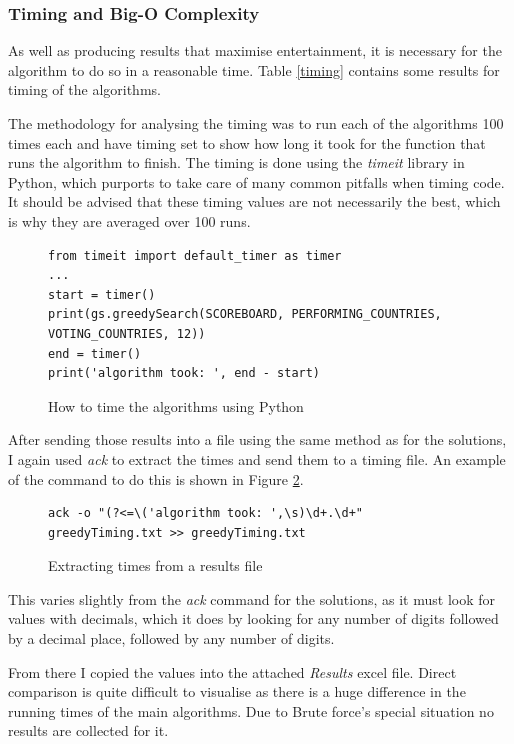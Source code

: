 \documentclass[12pt]{report}
\begin{document}
\subsubsection{Timing and Big-O Complexity}
As well as producing results that maximise entertainment, it is necessary for the algorithm to do so in a reasonable time. Table \ref{timing} contains some results for timing of the algorithms.

The methodology for analysing the timing was to run each of the algorithms 100 times each and have timing set to show how long it took for the function that runs the algorithm to finish. The timing is done using the \textit{timeit}\cite{PythonTimeit} library in Python, which purports to take care of many common pitfalls when timing code. It should be advised that these timing values are not necessarily the best, which is why they are averaged over 100 runs.

\begin{figure}[H]
\caption{How to time the algorithms using Python}
\label{timingCode}
\begin{verbatim}
from timeit import default_timer as timer
...
start = timer()
print(gs.greedySearch(SCOREBOARD, PERFORMING_COUNTRIES, VOTING_COUNTRIES, 12))
end = timer()
print('algorithm took: ', end - start)
\end{verbatim}
\end{figure}

After sending those results into a file using the same method as for the solutions, I again used \textit{ack} to extract the times and send them to a timing file. An example of the command to do this is shown in Figure \ref{timingAck}.

\begin{figure}[H]
\caption{Extracting times from a results file}
\label{timingAck}
\begin{verbatim}
ack -o "(?<=\('algorithm took: ',\s)\d+.\d+" greedyTiming.txt >> greedyTiming.txt
\end{verbatim}
\end{figure}

This varies slightly from the \textit{ack} command for the solutions, as it must look for values with decimals, which it does by looking for any number of digits followed by a decimal place, followed by any number of digits.

From there I copied the values into the attached \textit{Results} excel file. Direct comparison is quite difficult to visualise as there is a huge difference in the running times of the main algorithms. Due to Brute force's special situation no results are collected for it.
\end{document}
